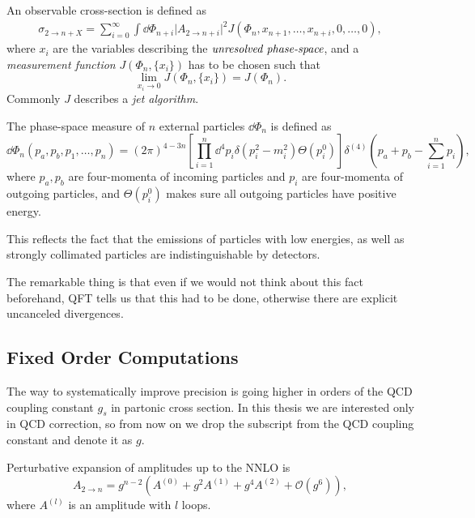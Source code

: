 An observable cross-section is defined as
\begin{multline}
  \sigma_{2\rightarrow n + X} = %
  \sum_{i=0}^{\infty} \int \dd\Phi_{n+i} \vert A_{2\rightarrow n+i} \vert^2 J(\Phi_{n},x_{n+1},\ldots,x_{n+i},0,\ldots,0),
  \label{eq:IRsafeXS}
\end{multline}
where $x_i$ are the variables describing the $\emph{unresolved phase-space}$, and
a \emph{measurement function} $J(\Phi_n, \{x_i\})$ has to be chosen such that
\begin{equation}
  \lim_{x_i\to 0}J(\Phi_n, \{x_i\}) = J(\Phi_n).
  \label{eq:IRsafeConditions}
\end{equation}
Commonly $J$ describes a \emph{jet algorithm}.

The phase-space measure of $n$ external particles $\dd\Phi_n$ is defined as
\begin{equation}
  \dd\Phi_n(p_a,p_b,p_1,\ldots,p_n) = (2\pi)^{4-3n} \left[ \prod_{i=1}^{n}\dd^4 p_i \delta(p_i^2-m_i^2) \Theta(p_i^{0}) \right] \delta^{(4)}\left(p_a+p_b - \sum_{i=1}^{n}p_i\right),
  \label{eq:PS}
\end{equation}
where $p_a,p_b$ are four-momenta of incoming particles and $p_i$ are four-momenta of outgoing particles, and
$\Theta(p_i^{0})$ makes sure all outgoing particles have positive energy.


This reflects the fact that the emissions of particles with low energies, as well
as strongly collimated particles are indistinguishable by detectors.

The remarkable thing is that even if we would not think about this fact beforehand, QFT tells us that
this had to be done, otherwise there are explicit uncanceled divergences.


\subsection{Fixed Order Computations}


The way to systematically improve precision is going higher in orders of the QCD coupling constant $g_s$
in partonic cross section. In this thesis we are interested only in QCD correction, so from now on
we drop the subscript from the QCD coupling constant and denote it as $g$.

Perturbative expansion of amplitudes up to the NNLO is
\begin{equation}
  A_{2\to n} = g^{n-2} \left( A^{(0)} + g^2 A^{(1)} + g^4 A^{(2)} + \mathcal{O}(g^{6}) \right),
\end{equation}
where $A^{(l)}$ is an amplitude with $l$ loops.


